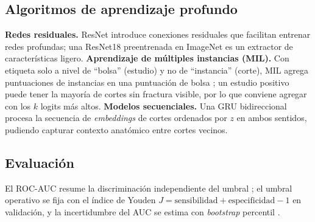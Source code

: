 \subsection{Algoritmos de aprendizaje profundo}
\textbf{Redes residuales.} ResNet \citep{he2016resnet} introduce conexiones residuales que facilitan entrenar redes profundas; una ResNet18 preentrenada en ImageNet \citep{deng2009imagenet} es un extractor de caracter\'isticas ligero.
\textbf{Aprendizaje de m\'ultiples instancias (MIL).} Con etiqueta solo a nivel de ``bolsa'' (estudio) y no de ``instancia'' (corte), MIL agrega puntuaciones de instancias en una puntuaci\'on de bolsa \citep{ilse2018mil}; un estudio positivo puede tener la mayor\'ia de cortes sin fractura visible, por lo que conviene agregar con los $k$ logits m\'as altos.
\textbf{Modelos secuenciales.} Una GRU \citep{cho2014gru} bidireccional procesa la secuencia de \emph{embeddings} de cortes ordenados por $z$ en ambos sentidos, pudiendo capturar contexto anat\'omico entre cortes vecinos.

\subsection{Evaluaci\'on}
El ROC-AUC resume la discriminaci\'on independiente del umbral \citep{hanley1982auc}; el umbral operativo se fija con el \'indice de Youden $J=\text{sensibilidad}+\text{especificidad}-1$ \citep{youden1950index} en validaci\'on, y la incertidumbre del AUC se estima con \emph{bootstrap} percentil \citep{efron1993bootstrap}.
